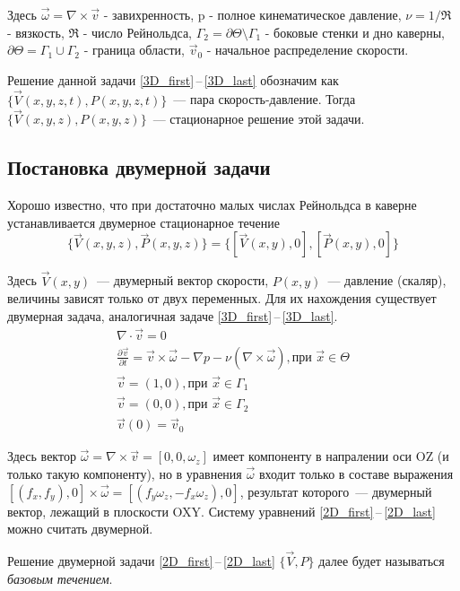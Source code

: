 Здесь $ \vec \omega = \nabla \times \vec v $ - завихренность, p - полное кинематическое давление,
$ \nu = 1 / \Re $ - вязкость, $ \Re $ - число Рейнольдса, $ \Gamma_2 = \partial \Theta \setminus \Gamma_1 $ - боковые стенки и дно каверны, $ \partial \Theta = \Gamma_1 \cup \Gamma_2 $ - 
граница области, $\vec v _0$ - начальное распределение скорости. 

Решение данной задачи \ref{3D_first}\,--\,\ref{3D_last} обозначим как $ \{ \vec V(x,y,z,t), P(x,y,z,t) \} $~--- пара скорость-давление. Тогда $ \{ \vec V(x,y,z), P(x,y,z) \} $~--- стационарное решение этой задачи. 


\subsection{Постановка двумерной задачи}

Хорошо известно, что при достаточно малых числах Рейнольдса в каверне устанавливается двумерное стационарное течение $$ 
  \{\vec V(x,y,z), \vec P(x,y,z) \} = \{[\vec V(x,y), 0], [\vec P(x,y), 0]\}
$$

Здесь $\vec V(x,y)$~--- двумерный вектор скорости, $P(x,y) $~--- давление (скаляр), величины зависят только от двух переменных. Для их нахождения существует двумерная задача, аналогичная задаче \ref{3D_first}\,--\,\ref{3D_last}.
\begin{gather}
  \label{2D_first}
  \nabla \cdot \vec v = 0 \\
  \frac{\partial \vec v}{\partial t} = \vec v \times \vec \omega - \nabla p - 
  \nu ( \nabla \times \vec \omega ), \text{при } \vec x \in \Theta \\
  \vec v = (1,0), \text{при } \vec x \in \Gamma_1\\
  \vec v = (0,0), \text{при } \vec x \in \Gamma_2\\
  \vec v (0) = \vec v _0
  \label{2D_last}
\end{gather}

Здесь вектор $ \vec \omega = \nabla \times \vec v = [0,0,\omega_z]$ имеет компоненту в напралении оси OZ (и только такую компоненту), но в уравнения $ \vec \omega $ входит только в составе выражения $ [(f_x,f_y),0] \times \vec \omega = [(f_y \omega_z, -f_x \omega_z), 0]$, результат которого~--- двумерный вектор, лежащий в плоскости OXY. Систему уравнений \ref{2D_first}\,--\,\ref{2D_last} можно считать двумерной. 

Решение двумерной задачи \ref{2D_first}\,--\,\ref{2D_last} $\{ \vec V, P \}$ далее будет называться \textit{базовым течением}.

